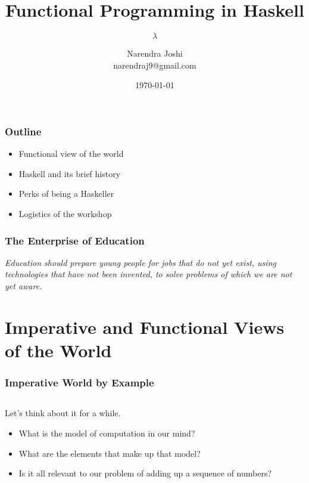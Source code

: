 \documentclass{beamer}
\title{Functional Programming in Haskell}
\subtitle{$\lambda$}
\author{Narendra Joshi \\
  \medskip
  narendraj9@gmail.com
}
\date{\today}
\begin{document}
\begin{frame}
  \titlepage
\end{frame}

\begin{frame}[t]
  \frametitle{Outline}

  \begin{itemize}
  \item{Functional view of the world}
  \item{Haskell and its brief history}
  \item{Perks of being a Haskeller}
  \item{Logistics of the workshop}
  \end{itemize}

\end{frame}

\begin{frame}[c]
  \frametitle{The Enterprise of Education}
  \begin{block}{}
    \emph{ Education should prepare young people for jobs that do not
      yet exist, using technologies that have not been invented,
      to solve problems of which we are not yet aware.}
  \end{block}
\end{frame}

\section{Imperative and Functional Views of the World}

\begin{frame}[fragile,t]
  \frametitle{Imperative World by Example}

  \inputminted[frame=lines,fontsize=\footnotesize,linenos=true]{c}{code/slides/sumfive.c}

  Let's think about it for a while.

  \begin{itemize}
  \item What is the model of computation in our mind?
  \item What are the elements that make up that model?
  \item Is it all relevant to our problem of adding up a sequence of numbers?
  \end{itemize}

\end{frame}
\end{document}

